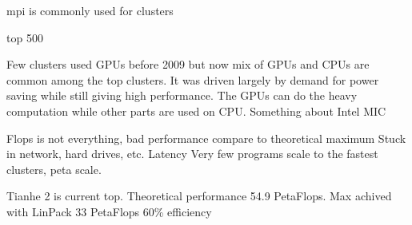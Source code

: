 \documentclass[10pt,a4paper]{report}
\begin{document}
mpi is commonly used for clusters\cite{introduction_hpc_hager}

top 500\cite{TOP500}

Few clusters used GPUs before 2009 but now mix of GPUs and CPUs are common among the top clusters. It was driven largely by demand for power saving while still giving high performance. The GPUs can do the heavy computation while other parts are used on CPU. \cite{introduction_hpc_hager}
Something about Intel MIC

Flops is not everything, bad performance compare to theoretical maximum
Stuck in network, hard drives, etc. Latency
Very few programs scale to the fastest clusters, peta scale.

Tianhe 2 is current top. Theoretical performance 54.9 PetaFlops.\cite{TOP500}
Max achived with LinPack 33 PetaFlops
60\% efficiency

\cite{introduction_hpc_hager}

\clearpage
\end{document}
